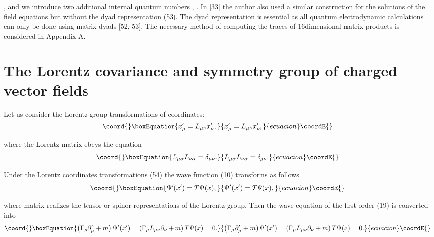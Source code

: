 \documentclass[a4paper,12pt]{article}
\begin{document}
\coordHE{}, and we introduce two additional internal quantum
numbers \coordHE{}, \coordHE{}. In [33] the author also used a similar construction for the
solutions of the field equations but without the dyad
representation (53). The dyad representation is essential as all
quantum electrodynamic calculations can only be done using
matrix-dyads [52, 53]. The necessary method of computing the
traces of 16\myHighlight{$-$}\coordHE{}dimensional matrix products is considered in
Appendix A.

\section{The Lorentz covariance and symmetry group \coordHE{} of
charged vector fields}

Let us consider the Lorentz group transformations of coordinates:
\begin{equation}\coord{}\boxEquation{
x_\mu ^{\prime }=L_{\mu \nu }x_\nu ^{\prime } , \label{54}
}{
x_\mu ^{\prime }=L_{\mu \nu }x_\nu ^{\prime } , }{ecuacion}\coordE{}\end{equation}

where the Lorentz matrix \coordHE{} obeys the equation
\begin{equation}\coord{}\boxEquation{
L_{\mu \alpha }L_{\nu \alpha }=\delta _{\mu \nu } . \label{55}
}{
L_{\mu \alpha }L_{\nu \alpha }=\delta _{\mu \nu } . }{ecuacion}\coordE{}\end{equation}

Under the Lorentz coordinates transformations (54) the wave function (10)
transforms as follows
\begin{equation}\coord{}\boxEquation{
\Psi ^{\prime }(x^{\prime })=T\Psi (x) , \label{56}
}{
\Psi ^{\prime }(x^{\prime })=T\Psi (x) , }{ecuacion}\coordE{}\end{equation}

where \coordHE{}matrix \coordHE{} realizes the tensor or spinor representations
of the Lorentz group. Then the wave equation of the first order (19) is
converted into
\begin{equation}\coord{}\boxEquation{
\left( \Gamma _\mu \partial _\mu ^{\prime }+m\right) \Psi ^{\prime
}(x^{\prime })=\left( \Gamma _\mu L_{\mu \nu }\partial _\nu
+m\right) T\Psi (x)=0 . \label{57}
}{
\left( \Gamma _\mu \partial _\mu ^{\prime }+m\right) \Psi ^{\prime
}(x^{\prime })=\left( \Gamma _\mu L_{\mu \nu }\partial _\nu
+m\right) T\Psi (x)=0 . }{ecuacion}\coordE{}\end{equation}
\end{document}
